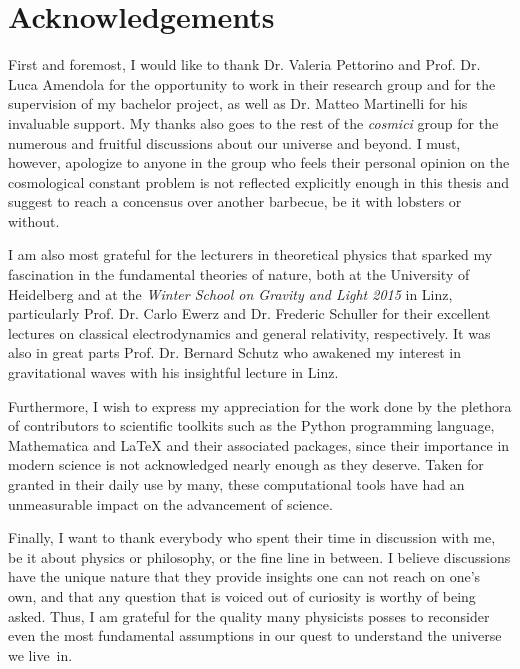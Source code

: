 \chapter{Acknowledgements}

First and foremost, I would like to thank Dr. Valeria Pettorino and Prof. Dr. Luca Amendola for the opportunity to work in their research group and for the supervision of my bachelor project, as well as Dr. Matteo Martinelli for his invaluable support. My thanks also goes to the rest of the \emph{cosmici} group for the numerous and fruitful discussions about our universe and beyond. I must, however, apologize to anyone in the group who feels their personal opinion on the cosmological constant problem is not reflected explicitly enough in this thesis and suggest to reach a concensus over another barbecue, be it with lobsters or without.

I am also most grateful for the lecturers in theoretical physics that sparked my fascination in the fundamental theories of nature, both at the University of Heidelberg and at the \emph{Winter School on Gravity and Light 2015} in Linz, particularly Prof. Dr. Carlo Ewerz and Dr. Frederic Schuller for their excellent lectures on classical electrodynamics and general relativity, respectively. It was also in great parts Prof. Dr. Bernard Schutz who awakened my interest in gravitational waves with his insightful lecture in Linz.

Furthermore, I wish to express my appreciation for the work done by the plethora of contributors to scientific toolkits such as the Python programming language, Mathematica and \LaTeX{} and their associated packages, since their importance in modern science is not acknowledged nearly enough as they deserve. Taken for granted in their daily use by many, these computational tools have had an unmeasurable impact on the advancement of science.

Finally, I want to thank everybody who spent their time in discussion with me, be it about physics or philosophy, or the fine line in between. I believe discussions have the unique nature that they provide insights one can not reach on one's own, and that any question that is voiced out of curiosity is worthy of being asked. Thus, I am grateful for the quality many physicists posses to reconsider even the most fundamental assumptions in our quest to understand the universe we live~in.
